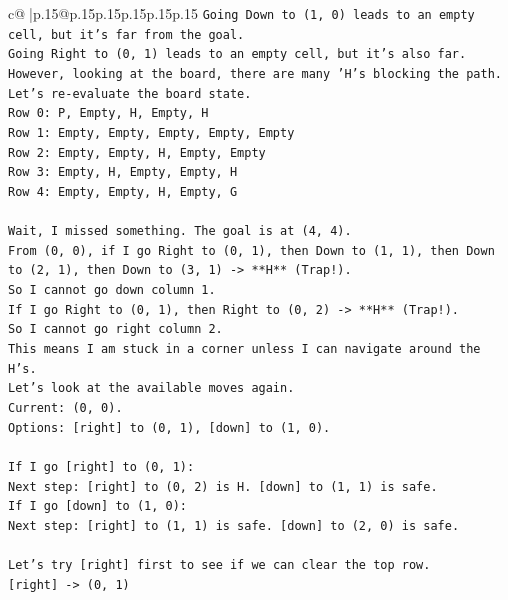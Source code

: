 \documentclass{article}
\begin{document}
{\begin{supertabular}{c@{$\;$}|p{.15\linewidth}@{}p{.15\linewidth}p{.15\linewidth}p{.15\linewidth}p{.15\linewidth}p{.15\linewidth}}
{{{\texttt{Going Down to (1, 0) leads to an empty cell, but it's far from the goal.} \\
\texttt{Going Right to (0, 1) leads to an empty cell, but it's also far.} \\
\texttt{However, looking at the board, there are many 'H's blocking the path.} \\
\texttt{Let's re{-}evaluate the board state.} \\
\texttt{Row 0: P, Empty, H, Empty, H} \\
\texttt{Row 1: Empty, Empty, Empty, Empty, Empty} \\
\texttt{Row 2: Empty, Empty, H, Empty, Empty} \\
\texttt{Row 3: Empty, H, Empty, Empty, H} \\
\texttt{Row 4: Empty, Empty, H, Empty, G} \\
\\ 
\texttt{Wait, I missed something. The goal is at (4, 4).} \\
\texttt{From (0, 0), if I go Right to (0, 1), then Down to (1, 1), then Down to (2, 1), then Down to (3, 1) {-}> **H** (Trap!).} \\
\texttt{So I cannot go down column 1.} \\
\texttt{If I go Right to (0, 1), then Right to (0, 2) {-}> **H** (Trap!).} \\
\texttt{So I cannot go right column 2.} \\
\texttt{This means I am stuck in a corner unless I can navigate around the H's.} \\
\texttt{Let's look at the available moves again.} \\
\texttt{Current: (0, 0).} \\
\texttt{Options: {[}right{]} to (0, 1), {[}down{]} to (1, 0).} \\
\\ 
\texttt{If I go {[}right{]} to (0, 1):} \\
\texttt{Next step: {[}right{]} to (0, 2) is H. {[}down{]} to (1, 1) is safe.} \\
\texttt{If I go {[}down{]} to (1, 0):} \\
\texttt{Next step: {[}right{]} to (1, 1) is safe. {[}down{]} to (2, 0) is safe.} \\
\\ 
\texttt{Let's try {[}right{]} first to see if we can clear the top row.} \\
\texttt{{[}right{]} {-}> (0, 1)} \\
\\ 
}}}
\end{supertabular}}
\end{document}
